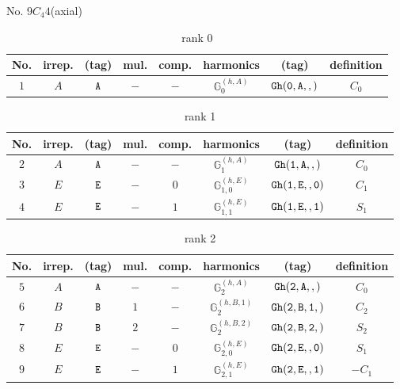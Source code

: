 \documentclass[fleqn,8pt]{jsarticle}
\begin{document}
\setcounter{MaxMatrixCols}{16}

\begin{center}
\LARGE
No. 9\quad$C_{4}$\quad$4$\quad[ tetragonal ] (axial)
\end{center}
\begin{table}[ht!]
\begin{center}
\caption{rank 0}
\renewcommand{\arraystretch}{1.3}
\begin{tabular}{cccccccc} \hline \hline
No. & irrep. & (tag) & mul. & comp. & harmonics & (tag) & definition \\ \hline
$ 1 $ & $ A $ & $ {\tt A} $ & $ - $ & $ - $ & $ \mathbb{G}_{0}^{(h,A)} $ & $ {\tt Gh(0,A,,)} $ & $ C_{0} $ \\
 \hline \hline
\end{tabular}
\end{center}
\end{table}
\begin{table}[ht!]
\begin{center}
\caption{rank 1}
\renewcommand{\arraystretch}{1.3}
\begin{tabular}{cccccccc} \hline \hline
No. & irrep. & (tag) & mul. & comp. & harmonics & (tag) & definition \\ \hline
$ 2 $ & $ A $ & $ {\tt A} $ & $ - $ & $ - $ & $ \mathbb{G}_{1}^{(h,A)} $ & $ {\tt Gh(1,A,,)} $ & $ C_{0} $ \\
$ 3 $ & $ E $ & $ {\tt E} $ & $ - $ & $ 0 $ & $ \mathbb{G}_{1,0}^{(h,E)} $ & $ {\tt Gh(1,E,,0)} $ & $ C_{1} $ \\
$ 4 $ & $ E $ & $ {\tt E} $ & $ - $ & $ 1 $ & $ \mathbb{G}_{1,1}^{(h,E)} $ & $ {\tt Gh(1,E,,1)} $ & $ S_{1} $ \\
 \hline \hline
\end{tabular}
\end{center}
\end{table}
\begin{table}[ht!]
\begin{center}
\caption{rank 2}
\renewcommand{\arraystretch}{1.3}
\begin{tabular}{cccccccc} \hline \hline
No. & irrep. & (tag) & mul. & comp. & harmonics & (tag) & definition \\ \hline
$ 5 $ & $ A $ & $ {\tt A} $ & $ - $ & $ - $ & $ \mathbb{G}_{2}^{(h,A)} $ & $ {\tt Gh(2,A,,)} $ & $ C_{0} $ \\
$ 6 $ & $ B $ & $ {\tt B} $ & $ 1 $ & $ - $ & $ \mathbb{G}_{2}^{(h,B,1)} $ & $ {\tt Gh(2,B,1,)} $ & $ C_{2} $ \\
$ 7 $ & $ B $ & $ {\tt B} $ & $ 2 $ & $ - $ & $ \mathbb{G}_{2}^{(h,B,2)} $ & $ {\tt Gh(2,B,2,)} $ & $ S_{2} $ \\
$ 8 $ & $ E $ & $ {\tt E} $ & $ - $ & $ 0 $ & $ \mathbb{G}_{2,0}^{(h,E)} $ & $ {\tt Gh(2,E,,0)} $ & $ S_{1} $ \\
$ 9 $ & $ E $ & $ {\tt E} $ & $ - $ & $ 1 $ & $ \mathbb{G}_{2,1}^{(h,E)} $ & $ {\tt Gh(2,E,,1)} $ & $ - C_{1} $ \\
 \hline \hline
\end{tabular}
\end{center}
\end{table}
\end{document}
